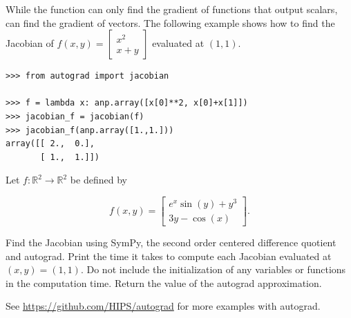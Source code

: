 While the  function can only find the gradient of functions that output scalars,  can find the gradient of vectors.
The following example shows how to find the Jacobian of $f(x,y) = \left[\begin{array}{c} x^2 \\ x+y \end{array}\right]$ evaluated at $(1,1)$.

\begin{lstlisting}
>>> from autograd import jacobian

>>> f = lambda x: anp.array([x[0]**2, x[0]+x[1]])
>>> jacobian_f = jacobian(f)
>>> jacobian_f(anp.array([1.,1.]))
array([[ 2.,  0.],
       [ 1.,  1.]])
\end{lstlisting}

\begin{problem}
\item Let $f: \mathbb{R}^2 \to \mathbb{R}^2$ be defined by

\begin{equation*}
f(x, y) =
\left[\begin{array}{c}
e^{x} \sin(y) + y^3 \\
3y - \cos(x)
\end{array}\right].
\end{equation*}

Find the Jacobian using SymPy, the second order centered difference quotient and autograd.
Print the time it takes to compute each Jacobian evaluated at $(x,y) = (1,1)$.
Do not include the initialization of any variables or functions in the computation time.
Return the value of the autograd approximation.
\end{problem}

See \url{https://github.com/HIPS/autograd} for more examples with autograd.

